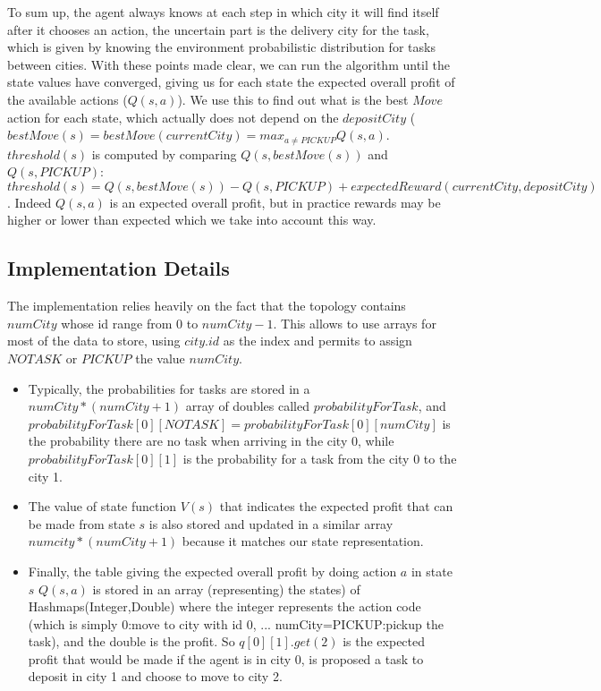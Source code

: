 \documentclass[11pt]{article}
\begin{document}
To sum up, the agent always knows at each step in which city it will find itself after it chooses an action, the uncertain part is the delivery city for the task, which is given by knowing the environment probabilistic distribution for tasks between cities. \newline
With these points made clear, we can run the algorithm until the state values have converged, giving us for each state the expected overall profit of the available actions ($Q(s,a)$). We use this to find out what is the best $Move$ action for each state, which actually does not depend on the $depositCity$ ($bestMove(s)=bestMove(currentCity)=max_{a \neq PICKUP}{Q(s,a)}$. \newline
$threshold(s)$ is computed by comparing $Q(s,bestMove(s))$ and $Q(s,PICKUP)$: \newline
$threshold(s)=Q(s,bestMove(s))-Q(s,PICKUP)+expectedReward(currentCity,depositCity)$. Indeed $Q(s,a)$ is an expected overall profit, but in practice rewards may be higher or lower than expected which we take into account this way.
 


\subsection{Implementation Details}

The implementation relies heavily on the fact that the topology contains $numCity$ whose id range from 0 to $numCity-1$. This allows to use arrays for most of the data to store, using $city.id$ as the index and permits to assign $NOTASK$ or $PICKUP$ the value $numCity$.
\begin{itemize}
\item Typically, the probabilities for tasks are stored in a $numCity*(numCity+1)$ array of doubles called $probabilityForTask$, and $probabilityForTask[0][NOTASK]=probabilityForTask[0][numCity]$ is the probability there are no task when arriving in the city 0, while $probabilityForTask[0][1]$ is the probability for a task from the city 0 to the city 1.

\item The value of state function $V(s)$ that indicates the expected profit that can be made from state $s$ is also stored and updated in a similar array $numcity*(numCity+1)$ because it matches our state representation.

\item Finally, the table giving the expected overall profit by doing action $a$ in state $s$ $Q(s,a)$ is stored in an array (representing) the states) of Hashmaps(Integer,Double) where the integer represents the action code (which is simply 0:move to city with id 0, ... numCity=PICKUP:pickup the task), and the double is the profit. So $q[0][1].get(2)$ is the expected profit that would be made if the agent is in city 0, is proposed a task to deposit in city 1 and choose to move to city 2.
\end{itemize}
\end{document}

